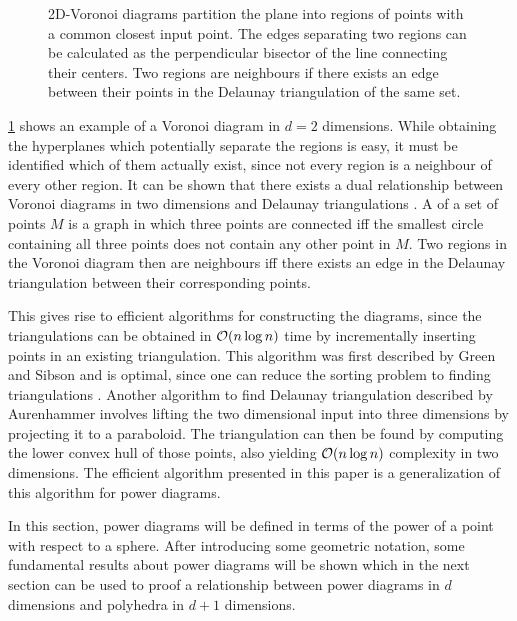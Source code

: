 \begin{figure}[tb]
    \caption{2D-Voronoi diagrams partition the plane into regions of points with a common closest input point. The edges separating two regions can be calculated as the perpendicular bisector of the line connecting their centers. Two regions are neighbours if there exists an edge between their points in the Delaunay triangulation of the same set.}
    \label{fig:voronoi}
\end{figure}

\cref{fig:voronoi} shows an example of a Voronoi diagram in $d = 2$ dimensions.
While obtaining the hyperplanes which potentially separate the regions is easy, it must be identified which of them actually exist, since not every region is a neighbour of every other region.
It can be shown that there exists a dual relationship between Voronoi diagrams in two dimensions and Delaunay triangulations \cite{aurenhammer1991voronoi}.
A  of a set of points $M$ is a graph in which three points are connected iff the smallest circle containing all three points does not contain any other point in $M$.
Two regions in the Voronoi diagram then are neighbours iff there exists an edge in the Delaunay triangulation between their corresponding points.

This gives rise to efficient algorithms for constructing the diagrams, since the triangulations can be obtained in $\mathcal{O}(n \log n)$ time by incrementally inserting points in an existing triangulation.
This algorithm was first described by Green and Sibson \cite{green1978computing} and is optimal, since one can reduce the sorting problem to finding triangulations \cite{aurenhammer1991voronoi}.
Another algorithm to find Delaunay triangulation described by Aurenhammer involves lifting the two dimensional input into three dimensions by projecting it to a paraboloid.
The triangulation can then be found by computing the lower convex hull of those points, also yielding $\mathcal{O}(n \log n)$ complexity in two dimensions.
The efficient algorithm presented in this paper is a generalization of this algorithm for power diagrams.

In this section, power diagrams will be defined in terms of the power of a point with respect to a sphere.
After introducing some geometric notation, some fundamental results about power diagrams will be shown which in the next section can be used to proof a relationship between power diagrams in $d$ dimensions and polyhedra in $d + 1$ dimensions.

